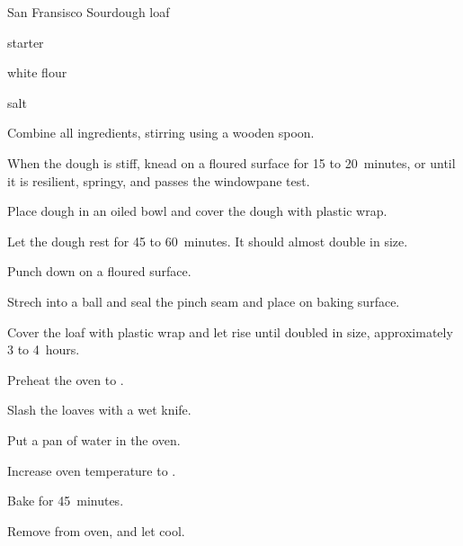 \begin{recipe}{San Fransisco Sourdough}{}{\kgr{\half} loaf}

\begin{ingredients}
\item \C{1\threequarter} starter 
\item {} white flour 
\item \tp{1\half} salt
\end{ingredients}

\begin{directions}
\item Combine all ingredients, stirring using a wooden spoon.
\item When the dough is stiff, knead on a floured surface for 15 to 20~minutes, or until it is resilient, springy, and passes the windowpane test.
\item Place dough in an oiled bowl and cover the dough with plastic wrap.
\item Let the dough rest for 45 to 60~minutes. It should almost double in size.
\item Punch down on a floured surface.
\item Strech into a ball and seal the pinch seam and place on baking surface.
\item Cover the loaf with plastic wrap and let rise until doubled in size, approximately 3 to 4~hours.
\item Preheat the oven to .
\item Slash the loaves with a wet knife.
\item Put a pan of water in the oven.
\item Increase oven temperature to .
\item Bake for 45~minutes.
\item Remove from oven, and let cool.
\end{directions}

\end{recipe}
